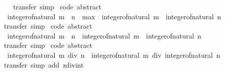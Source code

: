 \begin{isabellebody}
%
\isadelimproof
\ \ %
\endisadelimproof
%
\isatagproof
{}\isamarkupfalse%
\ transfer\ simp%
\endisatagproof
{\isafoldproof}%
%
\isadelimproof
\isanewline
%
\endisadelimproof
\isanewline
{}\isamarkupfalse%
\ {\isacharbrackleft}{\kern0pt}code\ abstract{\isacharbrackright}{\kern0pt}{\isacharcolon}{\kern0pt}\isanewline
\ \ {\isachardoublequoteopen}integer{\isacharunderscore}{\kern0pt}of{\isacharunderscore}{\kern0pt}natural\ {\isacharparenleft}{\kern0pt}m\ {\isacharminus}{\kern0pt}\ n{\isacharparenright}{\kern0pt}\ {\isacharequal}{\kern0pt}\ max\ {}\ {\isacharparenleft}{\kern0pt}integer{\isacharunderscore}{\kern0pt}of{\isacharunderscore}{\kern0pt}natural\ m\ {\isacharminus}{\kern0pt}\ integer{\isacharunderscore}{\kern0pt}of{\isacharunderscore}{\kern0pt}natural\ n{\isacharparenright}{\kern0pt}{\isachardoublequoteclose}\isanewline
%
\isadelimproof
\ \ %
\endisadelimproof
%
\isatagproof
{}\isamarkupfalse%
\ transfer\ simp%
\endisatagproof
{\isafoldproof}%
%
\isadelimproof
\isanewline
%
\endisadelimproof
\isanewline
{}\isamarkupfalse%
\ {\isacharbrackleft}{\kern0pt}code\ abstract{\isacharbrackright}{\kern0pt}{\isacharcolon}{\kern0pt}\isanewline
\ \ {\isachardoublequoteopen}integer{\isacharunderscore}{\kern0pt}of{\isacharunderscore}{\kern0pt}natural\ {\isacharparenleft}{\kern0pt}m\ {\isacharasterisk}{\kern0pt}\ n{\isacharparenright}{\kern0pt}\ {\isacharequal}{\kern0pt}\ integer{\isacharunderscore}{\kern0pt}of{\isacharunderscore}{\kern0pt}natural\ m\ {\isacharasterisk}{\kern0pt}\ integer{\isacharunderscore}{\kern0pt}of{\isacharunderscore}{\kern0pt}natural\ n{\isachardoublequoteclose}\isanewline
%
\isadelimproof
\ \ %
\endisadelimproof
%
\isatagproof
{}\isamarkupfalse%
\ transfer\ simp%
\endisatagproof
{\isafoldproof}%
%
\isadelimproof
\isanewline
%
\endisadelimproof
\isanewline
{}\isamarkupfalse%
\ {\isacharbrackleft}{\kern0pt}code\ abstract{\isacharbrackright}{\kern0pt}{\isacharcolon}{\kern0pt}\isanewline
\ \ {\isachardoublequoteopen}integer{\isacharunderscore}{\kern0pt}of{\isacharunderscore}{\kern0pt}natural\ {\isacharparenleft}{\kern0pt}m\ div\ n{\isacharparenright}{\kern0pt}\ {\isacharequal}{\kern0pt}\ integer{\isacharunderscore}{\kern0pt}of{\isacharunderscore}{\kern0pt}natural\ m\ div\ integer{\isacharunderscore}{\kern0pt}of{\isacharunderscore}{\kern0pt}natural\ n{\isachardoublequoteclose}\isanewline
%
\isadelimproof
\ \ %
\endisadelimproof
%
\isatagproof
{}\isamarkupfalse%
\ transfer\ {\isacharparenleft}{\kern0pt}simp\ add{\isacharcolon}{\kern0pt}\ zdiv{\isacharunderscore}{\kern0pt}int{\isacharparenright}{\kern0pt}%

\end{isabellebody}
